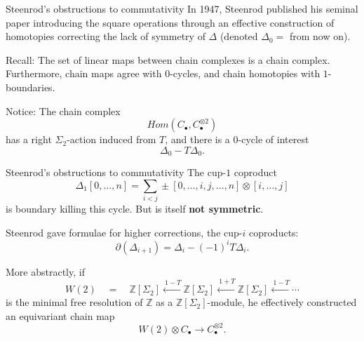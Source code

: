 \documentclass[10pt,t]{beamer}
\begin{document}
\begin{frame}{Steenrod's obstructions to commutativity}
	In 1947, Steenrod published his seminal paper introducing the square operations through an effective construction of homotopies correcting the lack of symmetry of $\Delta$ (denoted $\Delta_0 = $ from now on).
	
	\vspace*{15pt} \pause
	
	\textcolor{pblue}{Recall:} The set of linear maps between chain complexes is a chain complex. Furthermore, chain maps agree with $0$-cycles, and chain homotopies with $1$-boundaries.

	\vspace*{15pt}\pause
	
	\textcolor{pblue}{Notice:} The chain complex
	\begin{equation*} \label{eq: complex of maps to the tensor product}
	Hom\left(C_\bullet, C_\bullet^{\otimes 2}  \right)
	\end{equation*}
	has a right $\Sigma_2$-action induced from $T$, and there is a $0$-cycle of interest
	\begin{equation*}
	\Delta_0 - T \Delta_0.
	\end{equation*}
\end{frame}


\begin{frame}{Steenrod's obstructions to commutativity}
	The cup-$1$ coproduct
	\begin{equation*}
	\Delta_1 [0, \dots, n] = \sum_{i<j} \pm [0, \dots, i, j, \dots, n] \otimes [i, \dots, j]
	\end{equation*}
	is boundary killing this cycle. But is itself \textbf{not symmetric}.
	
	\vspace*{10pt} \pause
	
	Steenrod gave formulae for higher corrections, the cup-$i$ coproducts:
	\begin{equation*}
	\partial (\Delta_{i+1}) = \Delta_i - (-1)^i T \Delta_i.
	\end{equation*}
	
	\vspace*{0pt}\pause
	
	More abstractly, if
	\begin{equation*}
	W(2) \quad = \quad \mathbb Z[\Sigma_2] \stackrel{\ 1-T}{\longleftarrow} \mathbb Z[\Sigma_2] \stackrel{\ 1+T}{\longleftarrow} \mathbb Z[\Sigma_2] \stackrel{\ 1-T}{\longleftarrow} \cdots
	\end{equation*}
	is the minimal free resolution of $\mathbb Z$ as a $\mathbb Z[\Sigma_2]$-module, \pause he effectively constructed an equivariant chain map
	\begin{equation*}
	W(2) \otimes C_\bullet \to C_\bullet^{\otimes 2}.
	\end{equation*}
\end{frame}
	
\end{document}
